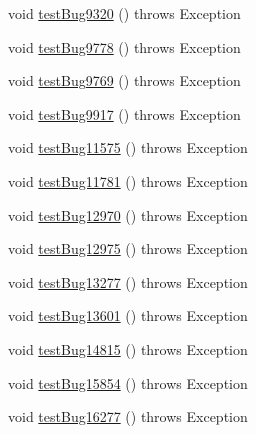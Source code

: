 \begin{DoxyCompactItemize}
\item 
void \mbox{\hyperlink{classtestsuite_1_1regression_1_1_meta_data_regression_test_a85b0332eeddf0448a8813e9e572be277}{test\+Bug9320}} ()  throws Exception 
\item 
void \mbox{\hyperlink{classtestsuite_1_1regression_1_1_meta_data_regression_test_a0cb82d7f4b575ebc9da191ff69ab222c}{test\+Bug9778}} ()  throws Exception 
\item 
void \mbox{\hyperlink{classtestsuite_1_1regression_1_1_meta_data_regression_test_aaeda7a5f9b968ba3bb866fb2fb62b75c}{test\+Bug9769}} ()  throws Exception 
\item 
void \mbox{\hyperlink{classtestsuite_1_1regression_1_1_meta_data_regression_test_a091172fd69f6c74846e6d1d59d889924}{test\+Bug9917}} ()  throws Exception 
\item 
void \mbox{\hyperlink{classtestsuite_1_1regression_1_1_meta_data_regression_test_a38b9ca5721854ae691f540ccda51593e}{test\+Bug11575}} ()  throws Exception 
\item 
void \mbox{\hyperlink{classtestsuite_1_1regression_1_1_meta_data_regression_test_a3f114c46c9a6eba1998830d138edeaf5}{test\+Bug11781}} ()  throws Exception 
\item 
void \mbox{\hyperlink{classtestsuite_1_1regression_1_1_meta_data_regression_test_a90992a3b409d173b89d677edbc407433}{test\+Bug12970}} ()  throws Exception 
\item 
void \mbox{\hyperlink{classtestsuite_1_1regression_1_1_meta_data_regression_test_ad4507d03539b3dcb6640da83424031e7}{test\+Bug12975}} ()  throws Exception 
\item 
void \mbox{\hyperlink{classtestsuite_1_1regression_1_1_meta_data_regression_test_a0c675c284ad20892d31732b73f09e7c6}{test\+Bug13277}} ()  throws Exception 
\item 
void \mbox{\hyperlink{classtestsuite_1_1regression_1_1_meta_data_regression_test_a9f064453a9a5087f0e60300320e2f041}{test\+Bug13601}} ()  throws Exception 
\item 
void \mbox{\hyperlink{classtestsuite_1_1regression_1_1_meta_data_regression_test_a0b21041ed61d6a8c105f6d7ee954efbd}{test\+Bug14815}} ()  throws Exception 
\item 
void \mbox{\hyperlink{classtestsuite_1_1regression_1_1_meta_data_regression_test_ae112984f3c8acf28251912e13475421c}{test\+Bug15854}} ()  throws Exception 
\item 
void \mbox{\hyperlink{classtestsuite_1_1regression_1_1_meta_data_regression_test_a7ddf69bf32cb524239b07b822585d44d}{test\+Bug16277}} ()  throws Exception 

\end{DoxyCompactItemize}
